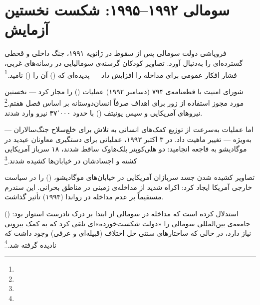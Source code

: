 \section{سومالی ۱۹۹۲–۱۹۹۵: شکست نخستین آزمایش}
\label{sec:ch10-somalia}

فروپاشی دولت سومالی پس از سقوط  در ژانویه ۱۹۹۱، جنگ داخلی و قحطی گسترده‌ای را به‌دنبال آورد. تصاویر کودکان گرسنه‌ی سومالیایی در رسانه‌های غربی، فشار افکار عمومی برای مداخله را افزایش داد — پدیده‌ای که  () آن را  () نامید.\footnote{}

شورای امنیت با قطعنامه‌ی ۷۹۴ (دسامبر ۱۹۹۲) عملیات  () را مجاز کرد — نخستین مورد مجوز استفاده از زور برای اهداف صرفاً انسان‌دوستانه بر اساس فصل هفتم.\footnote{} نیروهای آمریکایی و سپس یونیتف () با حدود ۳۷٬۰۰۰ نیرو وارد شدند.

اما عملیات به‌سرعت از توزیع کمک‌های انسانی به تلاش برای خلع‌سلاح جنگ‌سالاران — به‌ویژه   — تغییر ماهیت داد. در ۳ اکتبر ۱۹۹۳، عملیاتی برای دستگیری معاونان عیدید در موگادیشو به فاجعه انجامید: دو هلی‌کوپتر بلک‌هاوک ساقط شدند، ۱۸ سرباز آمریکایی کشته و اجسادشان در خیابان‌ها کشیده شدند.\footnote{}

\begin{tcolorbox}[enemybox, title={نقطه‌ی عطف: موگادیشو ۱۹۹۳}]
تصاویر کشیده شدن جسد سربازان آمریکایی در خیابان‌های موگادیشو،  () را در سیاست خارجی آمریکا ایجاد کرد: اکراه شدید از مداخله‌ی زمینی در مناطق بحرانی. این سندرم مستقیماً بر عدم مداخله در رواندا (۱۹۹۴) تأثیر گذاشت.
\end{tcolorbox}

 () استدلال کرده است که مداخله در سومالی از ابتدا بر درک نادرست استوار بود: جامعه‌ی بین‌المللی سومالی را «دولت شکست‌خورده»ای تلقی کرد که به کمک بیرونی نیاز دارد، در حالی که ساختارهای سنتی حل اختلاف (قبیله‌ای و عرفی) وجود داشت که نادیده گرفته شد.\footnote{}


